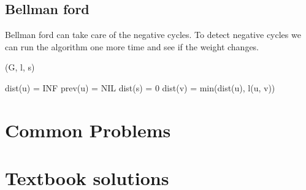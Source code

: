 \documentclass[11pt,letterpaper]{article}
\begin{document}
\subsection{Bellman ford}
Bellman ford can take care of the negative cycles. To detect negative cycles we can run the algorithm one more time and see if the weight changes. 
\begin{algorithm}
	\caption{(G, l, s)}
	\begin{algorithmic}[1]
			\State dist(u) = INF
			\State prev(u) = NIL
		\EndFor		
		\State dist(s) = 0
				\State dist(v) = min(dist(u), l(u, v))
			\EndFor
		\EndFor
	\end{algorithmic}
\end{algorithm}


\section{Common Problems}
\section{Textbook solutions}
\end{document}
